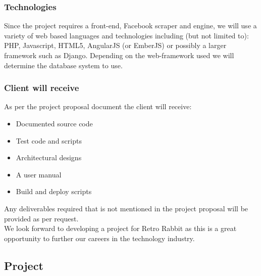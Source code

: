 \documentclass{article}
\begin{document}
	\subsubsection{Technologies}
	Since the project requires a front-end, Facebook scraper and engine, we will use a variety of web based languages and technologies including (but not limited to): PHP, Javascript, HTML5, AngularJS (or EmberJS) or possibly a larger framework such as Django. Depending on the web-framework used we will determine the database system to use. 
	
	\subsubsection{Client will receive}
	As per the project proposal document the client will receive:
	\begin{itemize}
		\item Documented source code
		\item Test code and scripts
		\item Architectural designs
		\item A user manual
		\item Build and deploy scripts
	\end{itemize}
	Any deliverables required that is not mentioned in the project proposal will be provided as per request.\\
	
	We look forward to developing a project for Retro Rabbit as this is a great opportunity to further our  careers in the technology industry.
	
	\subsection{Project }
\end{document}
